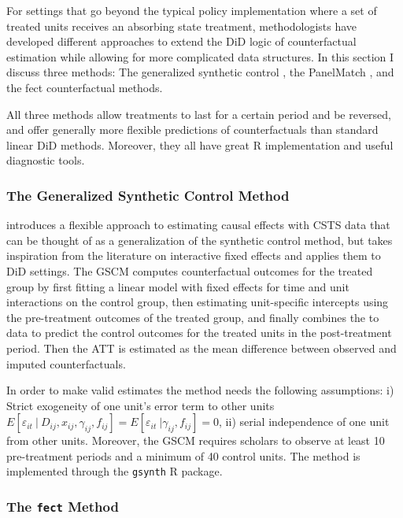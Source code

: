 \documentclass[hidelinks]{article}\usepackage[]{graphicx}\usepackage[]{color}
\begin{document}
For settings that go beyond the typical policy implementation where a set of treated units receives an absorbing state treatment, methodologists have developed different approaches to extend the DiD logic of counterfactual estimation while allowing for more complicated data structures. In this section I discuss three methods: The generalized synthetic control \parencite[GSCM]{Xu2017}, the PanelMatch \parencite{Imai2021, Kim2021}, and the fect \parencite{Liu} counterfactual methods.

All three methods allow treatments to last for a certain period and be reversed, and offer generally more flexible predictions of counterfactuals than standard linear DiD methods. Moreover, they all have great R implementation and useful diagnostic tools.

\subsubsection{The Generalized Synthetic Control Method}

\textcite{Xu2017} introduces a flexible approach to estimating causal effects with CSTS data that can be thought of as a generalization of the synthetic control method, but takes inspiration from the literature on interactive fixed effects \parencite{Bai2009} and applies them to DiD settings. The GSCM computes counterfactual outcomes for the treated group by first fitting a linear model with fixed effects for time and unit interactions on the control group, then estimating unit-specific intercepts using the pre-treatment outcomes of the treated group, and finally combines the to data to predict the control outcomes for the treated units in the post-treatment period. Then the ATT is estimated as the mean difference between observed and imputed counterfactuals.

In order to make valid estimates the method needs the following assumptions: i) Strict exogeneity of one unit's error term to other units $E\left[ \varepsilon_{it}\ | \ D_{ij},x_{ij},\gamma_{ij}, f_{ij}\right] = E\left[ \varepsilon_{it}\ | \gamma_{ij}, f_{ij}\right] = 0$, ii) serial independence of one unit from other units. Moreover, the GSCM requires scholars to observe at least 10 pre-treatment periods and a minimum of 40 control units. The method is implemented through the \texttt{gsynth} R package.

\subsubsection{The \texttt{fect} Method}
\end{document}
